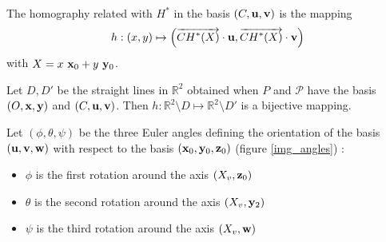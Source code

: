 \begin{Def}
 The homography related with $H^*$ in the basis $(C,\mathbf{u},\mathbf{v})$ is the mapping
\begin{equation}
h : (x,y)  \mapsto \left( \overrightarrow{CH^*(X)}\cdot \mathbf{u} , \overrightarrow{CH^*(X)}\cdot \mathbf{v} \right)
\label{formule_homographie_H}
\end{equation}
with $X=x~\mathbf{x}_0 + y~\mathbf{y}_0 $.
\label{def_homographie_H}
\end{Def}

Let $D,D'$ be the straight lines in $\mathbb{R}^2$ obtained when $P$ and $\mathcal{P}$ have the basis $(O,\mathbf{x},\mathbf{y})$ and $(C,\mathbf{u},\mathbf{v})$. Then $h:\mathbb{R}^2  \setminus D \mapsto \mathbb{R}^2  \setminus D'$ is a bijective mapping.


\begin{Def}
\label{decompogeo_def_angles}
Let $(\phi , \theta ,\psi )$ be the three Euler angles defining the orientation of the basis $(\mathbf{u},\mathbf{v},\mathbf{w})$ with respect to the basis $(\mathbf{x}_0,\mathbf{y}_0,\mathbf{z}_0)$ (figure \ref{img_angles}) :
\begin{itemize}
\item $\phi$ is the first rotation around the axis $(X_v ,\mathbf{z}_0)$
\item $\theta$ is the second rotation around the axis $(X_v , \mathbf{y}_2 )$
\item $\psi$ is the third rotation around the axis $(X_v , \mathbf{w} )$
\end{itemize}
\end{Def}


